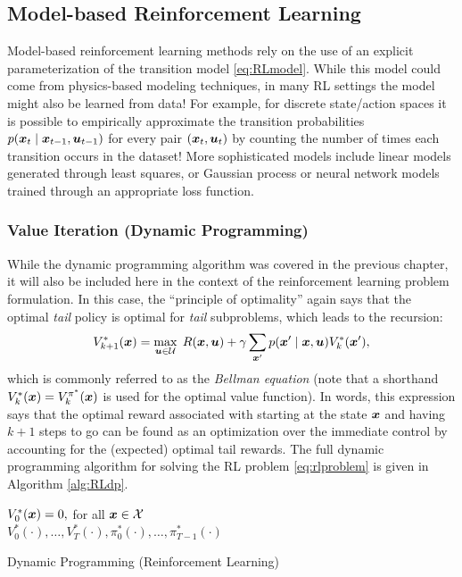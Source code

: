 \subsection{Model-based Reinforcement Learning}
Model-based reinforcement learning methods rely on the use of an explicit parameterization of the transition model \eqref{eq:RLmodel}. While this model could come from physics-based modeling techniques, in many RL settings the model might also be learned from data! For example, for discrete state/action spaces it is possible to empirically approximate the transition probabilities $p(\bm{x}_t \mid \bm{x}_{t-1}, \bm{u}_{t-1})$ for every pair $(\bm{x}_t,\bm{u}_t)$ by counting the number of times each transition occurs in the dataset! More sophisticated models include linear models generated through least squares, or Gaussian process or neural network models trained through an appropriate loss function.

\subsubsection{Value Iteration (Dynamic Programming)}
While the dynamic programming algorithm was covered in the previous chapter, it will also be included here in the context of the reinforcement learning problem formulation. In this case, the ``principle of optimality'' again says that the optimal \textit{tail} policy is optimal for \textit{tail} subproblems, which leads to the recursion:
\begin{equation} \label{eq:RLbellman}
V^*_{k+1}(\bm{x}) = \underset{\bm{u} \in \mathcal{U}}{\max} \:\:R(\bm{x}, \bm{u}) + \gamma \sum_{\bm{x}'} p(\bm{x}' \mid \bm{x}, \bm{u}) V^*_{k}(\bm{x}'),
\end{equation}
which is commonly referred to as the \textit{Bellman equation} (note that a shorthand $V^*_{k}(\bm{x}) = V^{\pi^*}_{k}(\bm{x})$ is used for the optimal value function). In words, this expression says that the optimal reward associated with starting at the state $\bm{x}$ and having $k+1$ steps to go can be found as an optimization over the immediate control by accounting for the (expected) optimal tail rewards.
The full dynamic programming algorithm for solving the RL problem \eqref{eq:rlproblem} is given in Algorithm \ref{alg:RLdp}.
\begin{algorithm}[ht]
 $V_0^*(\bm{x}) = 0,$ for all $\bm{x} \in \mathcal{X}$\\
 \Return $V^*_0(\cdot),\dots,V^*_T(\cdot), \pi^*_0(\cdot),\dots,\pi^*_{T-1}(\cdot)$
 \caption{Dynamic Programming (Reinforcement Learning)}
 \label{alg:RLdp}
\end{algorithm}

